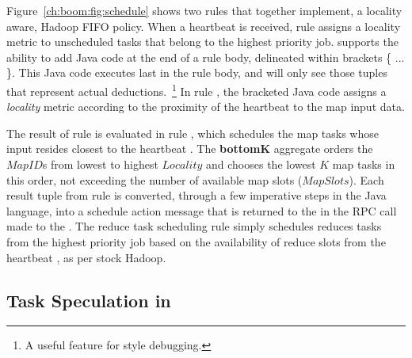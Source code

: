 Figure~\ref{ch:boom:fig:schedule} shows two rules that together implement, a
locality aware, Hadoop FIFO policy.  When a \TT heartbeat is received, rule
 assigns a locality metric to unscheduled tasks that belong to the
highest priority job.  \JOL supports the ability to add Java code at the end of
a rule body, delineated within brackets \{ ...  \}.  This Java code executes
last in the rule body, and will only see those tuples that represent actual
deductions.~\footnote{A useful feature for  style debugging.} In
rule , the bracketed Java code assigns a {\em locality} metric according
to the proximity of the heartbeat \TT to the map input data.

The result of rule  is evaluated in rule , which schedules the
map tasks whose input resides closest to the heartbeat \TT.  The {\bf bottomK}
aggregate orders the $MapID$s from lowest to highest $Locality$ and chooses the
lowest $K$ map tasks in this order, not exceeding the number of available map
slots ($MapSlots$).  Each result tuple from rule  is converted, through
a few imperative steps in the Java language, into a schedule action message
that is returned to the \TT in the RPC call made to the \JT.  The reduce task
scheduling rule simply schedules reduces tasks from the highest priority job
based on the availability of reduce slots from the heartbeat \TT, as per stock
Hadoop.

\subsection{Task Speculation in \OVERLOG}
\label{ch:boom:sec:late}

